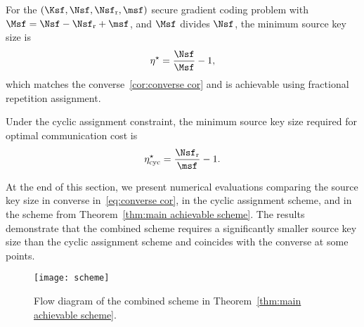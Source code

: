 \documentclass[conference,letterpaper]{IEEEtran}
\begin{document}
 
\begin{rem}
\label{rem:extreme cases}
\em

For the $(\Ksf,\Nsf,\Nsf_{\rm r}, \msf)$ secure gradient coding problem with  $\Msf= \Nsf - \Nsf_{\rm r} + \msf$, and $\Msf$ divides $\Nsf$, the minimum source key size is
\begin{align}
    \eta^{\star} = \frac{\Nsf}{\Msf} - 1, \label{eq:gradient eta rho rep}
\end{align}
which matches the converse~\eqref{cor:converse cor} and is achievable using fractional repetition assignment.

Under the cyclic assignment constraint, the minimum source key size required for optimal communication cost is
\begin{align}
    \eta^{\star}_{\text{cyc}} = \frac{\Nsf_{\rm r}}{\msf} - 1. \label{eq:gradient eta cyc}
\end{align}


\end{rem}

\iffalse
\begin{rem}[Simplification idea of Theorem~\ref{thm:main achievable scheme}]
\label{M'=M}
We divide the $\Ksf$ datasets into $\Nsf$ non-overlapping, equal-length groups, where the $i^{\text{th}}$ group, $\Gc_i = \{k \in [\Ksf] : \text{Mod}(k, \Nsf) = i\}$, contains $\frac{\Ksf}{\Nsf}$ datasets for each $i \in [\Nsf]$. Each group $\Gc_i$ is assigned to $\Msf = \Nsf - \Nsf_{\rm r} + \msf$ servers, which compute the merged message $W^{\prime}_i$. Thus, we reduce the $(\Ksf, \Nsf, \Nsf_{\rm r}, 1, \Msf)$ secure distributed linearly separable computation problem to the $(\Nsf, \Nsf, \Nsf_{\rm r}, 1, \Msf)$ problem.
\end{rem}
\fi


At the end of this section, we present numerical evaluations comparing the source key size in converse in~\eqref{eq:converse cor}, in the cyclic assignment scheme, and in the scheme from Theorem~\ref{thm:main achievable scheme}. %
The results demonstrate that the combined scheme requires a significantly smaller source key size than the cyclic assignment scheme and coincides with the converse at some points.


\begin{figure*}%
\centerline{\texttt{[image: scheme]}}
\caption{\small Flow diagram of the combined scheme in Theorem~\ref{thm:main achievable scheme}.}
\label{fig:scheme} %
\end{figure*}
\end{document}
